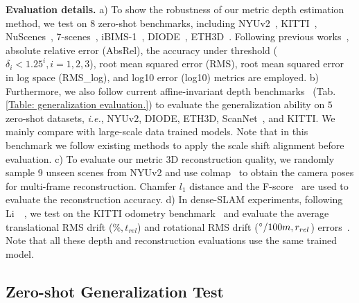 \noindent\textbf{Evaluation details.}
a) To show the robustness of our metric depth estimation 
method, we test on 8 zero-shot benchmarks, including NYUv2~\cite{silberman2012indoor}, KITTI~\cite{Geiger2013IJRR}, NuScenes~\cite{caesar2020nuscenes}, 7-scenes~\cite{shotton2013scene}, iBIMS-1~\cite{koch2018evaluation}, DIODE~\cite{vasiljevic2019diode}, ETH3D~\cite{schops2017multi}. Following previous works~\cite{yuan2022new}, absolute relative error (AbsRel),  the accuracy under threshold ($\delta_{i} < 1.25^{i}, i=1, 2, 3$), root mean squared error (RMS), root mean squared error in log space (RMS\_{log}), and log10 error (log10) metrics are employed. 
b) Furthermore, %
we also follow current affine-invariant depth benchmarks~\cite{leres, zhang2022hierarchical} (Tab. \ref{Table: generalization evaluation.}) to evaluate the generalization ability on $5$ zero-shot datasets, \textit{i.e.},  NYUv2, DIODE, ETH3D, ScanNet~\cite{dai2017scannet}, and KITTI. We mainly compare with large-scale data trained models. Note that in this benchmark we follow existing methods to apply the scale shift alignment before evaluation. 
c) To evaluate our metric 3D reconstruction quality, we randomly sample 9 unseen scenes from NYUv2 and use colmap~\cite{schoenberger2016mvs} to obtain the camera poses for multi-frame reconstruction. Chamfer $l_1$ distance and the F-score~\cite{knapitsch2017tanks} are used to evaluate the reconstruction accuracy. 
d) In dense-SLAM experiments, following Li~\etal~\cite{li2021generalizing}, we test on the KITTI odometry benchmark~\cite{Geiger2013IJRR} and evaluate the average translational RMS drift ($\%, t_{rel}$) and rotational RMS drift ($\degree/100m, r_{rel}$) errors~\cite{Geiger2013IJRR}.
Note that all these depth and reconstruction evaluations use the same trained model. 

\subsection{Zero-shot Generalization %
Test
}

